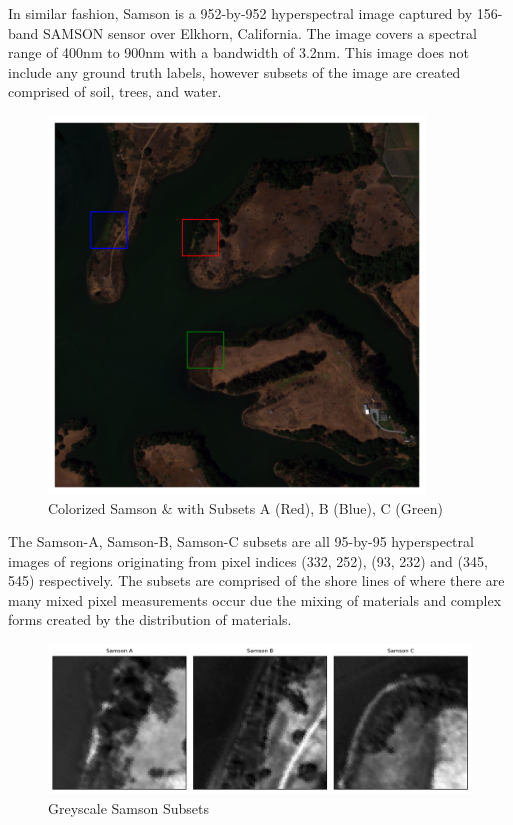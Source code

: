 In similar fashion, Samson is a 952-by-952 hyperspectral image captured by 156-band SAMSON sensor over Elkhorn, California. The image covers a spectral range of 400nm to 900nm with a bandwidth of 3.2nm. This image does not include any ground truth labels, however subsets of the image are created comprised of soil, trees, and water.
\begin{figure}[H]
  \centering
  \includegraphics[width=10cm]{samson_full.png}  %
  \caption{Colorized Samson \& with Subsets A (Red), B (Blue), C (Green)}
  \label{samson}  %
\end{figure}

The Samson-A, Samson-B, Samson-C subsets are all 95-by-95 hyperspectral images of regions originating from pixel indices (332, 252), (93, 232) and (345, 545) respectively. The subsets are comprised of the shore lines of where there are many mixed pixel measurements occur due the mixing of materials and complex forms created by the distribution of materials.
\begin{figure}[H]
  \centering
  \includegraphics[width=15cm]{samsonabc.png}  %
  \caption{Greyscale Samson Subsets}
  \label{samsonabc}  %
\end{figure}



